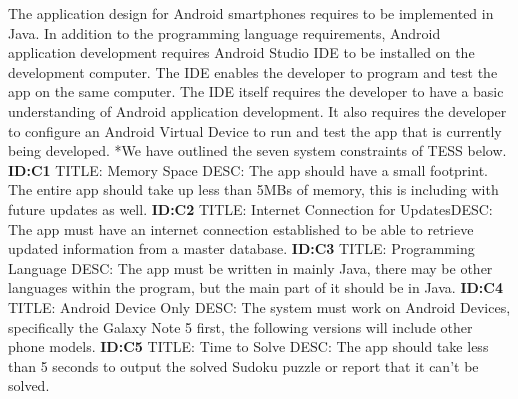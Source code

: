 \documentclass{article}
\begin{document}
The application design for Android smartphones requires to be implemented in Java. In addition to the programming language requirements, Android application development requires Android Studio IDE to be installed on the development computer. The IDE enables the developer to program and test the app on the same computer.\newline \newline
The IDE itself requires the developer to have a basic understanding of Android application development. It also requires the developer to configure an Android Virtual Device to run and test the app that is currently being developed.\newline
\newline
*We have outlined the seven system constraints of TESS below. 
\newline
\textbf{ID:C1} \newline TITLE: Memory Space \newline DESC: The app should have a small footprint. The entire app should take up less than 5MBs of memory, this is including with future updates as well.\newline\newline
\textbf{ID:C2} \newline TITLE: Internet Connection for Updates\newline DESC: The app must have an internet connection established to be able to retrieve updated information from a master database. \newline\newline
\textbf{ID:C3} \newline TITLE: Programming Language \newline DESC: The app must be written in mainly Java, there may be other languages within the program, but the main part of it should be in Java.\newline\newline
\textbf{ID:C4} \newline TITLE: Android Device Only \newline DESC: The system must work on Android Devices, specifically the Galaxy Note 5 first, the following versions will include other phone models.\newline\newline
\textbf{ID:C5} \newline TITLE: Time to Solve \newline DESC: The app should take less than 5 seconds to output the solved Sudoku puzzle or report that it can't be solved.\newline\newline
\end{document}

